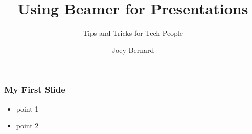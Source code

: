 \documentclass{beamer}
\begin{document}
\title{Using Beamer for Presentations}
\subtitle{Tips and Tricks for Tech People}
\author{Joey Bernard}

\begin{frame}
   \titlepage
\end{frame}


\begin{frame}
   \frametitle{My First Slide}
   \begin{itemize}
      \item point 1
      \item point 2
   \end{itemize}
\end{frame}
\end{document}
